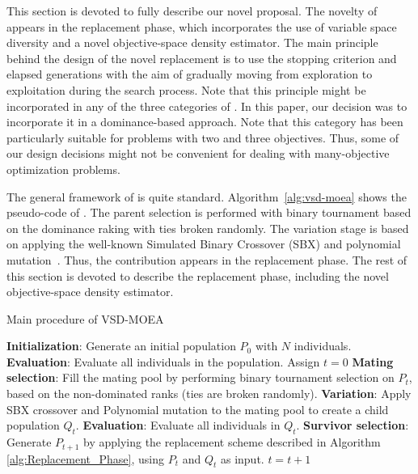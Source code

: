 
This section is devoted to fully describe our novel proposal.
%
The novelty of \VSDMOEA{} appears in the replacement phase, which incorporates
the use of variable space diversity and a novel objective-space density estimator. 
%
The main principle behind the design of the novel replacement is to use the stopping criterion and 
elapsed generations with the aim of gradually moving from exploration to exploitation during the search process.
%
Note that this principle might be incorporated in any of the three categories of \MOEAS{}.
%
In this paper, our decision was to incorporate it in a dominance-based approach.
%
Note that this category has been particularly suitable for problems with two and three objectives.
%
Thus, some of our design decisions might not be convenient for dealing with many-objective optimization problems.

The general framework of \VSDMOEA{} is quite standard.
%
Algorithm~\ref{alg:vsd-moea} shows the pseudo-code of \VSDMOEA{}.
%
The parent selection is performed with binary tournament based on the dominance raking with ties broken randomly.
%
The variation stage is based on applying the well-known Simulated Binary Crossover (SBX) 
and polynomial mutation~\cite{Joel:SBX1994, Joel:Mutation}.
%
Thus, the contribution appears in the replacement phase.
%
The rest of this section is devoted to describe the replacement phase, including the novel objective-space density 
estimator.

\begin{algorithm}[t]
	\caption{Main procedure of VSD-MOEA} 
	\begin{small}
\begin{algorithmic}[1]
 	\STATE \textbf{Initialization}: Generate an initial population $P_0$ with $N$ individuals.
	\STATE \textbf{Evaluation}: Evaluate all individuals in the population.
	\STATE Assign $t=0$
	   \STATE \textbf{Mating selection}: Fill the mating pool by performing binary tournament selection on $P_t$, 
		 based on the non-dominated ranks (ties are broken randomly).
	   \STATE \textbf{Variation}: Apply SBX crossover and Polynomial mutation to the mating pool to create a child population $Q_t$.
		 \STATE \textbf{Evaluation}: Evaluate all individuals in $Q_t$.
	   \STATE \textbf{Survivor selection}: Generate $P_{t+1}$ by applying the replacement scheme 
		 described in Algorithm \ref{alg:Replacement_Phase}, using $P_t$ and $Q_t$ as input.
	   \STATE $t=t+1$
	\ENDWHILE
	\end{algorithmic}
	\end{small}
\label{alg:vsd-moea}
\end{algorithm}


